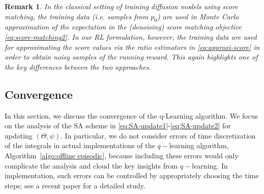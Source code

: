 \documentclass[11pt]{article}
\newtheorem{remark}{Remark}
\begin{document}
\begin{remark}
In the classical setting of training diffusion models using score matching, the training data (i.e. samples from $p_0$) are used in Monte Carlo approximation of the expectation in the (denoising) score matching objective \eqref{eq:score-matching2}.
In our RL formulation, however, the training data are used for approximating the score {\it values} via the ratio estimators in \eqref{eq:approxi-score} in order to obtain noisy samples of the running reward. This again highlights one of the key differences between the two approaches.

\end{remark}




\subsection{Convergence}\label{sec:convergence}
In this section, we discuss the convergence  of the q-Learning algorithm. We focus on the analysis of the SA scheme in \eqref{eq:SA-update1}-\eqref{eq:SA-update2} for updating $(\Theta, \psi)$. In particular,
we do not consider errors of
time discretization of the integrals in actual implementations of the $q-$learning algorithm,  Algorithm~\ref{algo:offline episodic}, because including
these errors would only complicate the analysis and cloud the key insights from $q-$learning. In implementation, such errors can be controlled by appropriately choosing the time steps; see a recent paper \cite{jia2025accuracy} for a detailed study.
\end{document}
